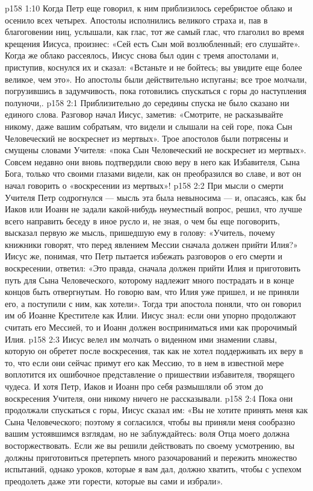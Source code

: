\vs p158 1:10 Когда Петр еще говорил, к ним приблизилось серебристое облако и осенило всех четырех. Апостолы исполнились великого страха и, пав в благоговении ниц, услышали, как глас, тот же самый глас, что глаголил во время крещения Иисуса, произнес: «Сей есть Сын мой возлюбленный; его слушайте». Когда же облако рассеялось, Иисус снова был один с тремя апостолами и, приступив, коснулся их и сказал: «Встаньте и не бойтесь; вы увидите еще более великое, чем это». Но апостолы были действительно испуганы; все трое молчали, погрузившись в задумчивость, пока готовились спускаться с горы до наступления полуночи,.
\vs p158 2:1 Приблизительно до середины спуска не было сказано ни единого слова. Разговор начал Иисус, заметив: «Смотрите, не расказывайте никому, даже вашим собратьям, что видели и слышали на сей горе, пока Сын Человеческий не воскреснет из мертвых». Трое апостолов были потрясены и смущены словами Учителя: «пока Сын Человеческий не воскреснет из мертвых». Совсем недавно они вновь подтвердили свою веру в него как Избавителя, Сына Бога, только что своими глазами видели, как он преобразился во славе, и вот он начал говорить о «воскресении из мертвых»!
\vs p158 2:2 При мысли о смерти Учителя Петр содрогнулся --- мысль эта была невыносима --- и, опасаясь, как бы Иаков или Иоанн не задали какой\hyp{}нибудь неуместный вопрос, решил, что лучше всего направить беседу в иное русло и, не зная, о чем бы еще поговорить, высказал первую же мысль, пришедшую ему в голову: «Учитель, почему книжники говорят, что перед явлением Мессии сначала должен прийти Илия?» Иисус же, понимая, что Петр пытается избежать разговоров о его смерти и воскресении, ответил: «Это правда, сначала должен прийти Илия и приготовить путь для Сына Человеческого, которому надлежит много пострадать и в конце концов быть отвергнутым. Но говорю вам, что Илия уже пришел, и не приняли его, а поступили с ним, как хотели». Тогда три апостола поняли, что он говорил им об Иоанне Крестителе как Илии. Иисус знал: если они упорно продолжают считать его Мессией, то и Иоанн должен восприниматься ими как пророчимый Илия.
\vs p158 2:3 Иисус велел им молчать о виденном ими знамении славы, которую он обретет после воскресения, так как не хотел поддерживать их веру в то, что если они сейчас примут его как Мессию, то в нем в известной мере воплотится их ошибочное представление о пришествии избавителя, творящего чудеса. И хотя Петр, Иаков и Иоанн про себя размышляли об этом до воскресения Учителя, они никому ничего не рассказывали.
\vs p158 2:4 Пока они продолжали спускаться с горы, Иисус сказал им: «Вы не хотите принять меня как Сына Человеческого; поэтому я согласился, чтобы вы приняли меня сообразно вашим устоявшимся взглядам, но не заблуждайтесь: воля Отца моего должна восторжествовать. Если же вы решили действовать по своему усмотрению, вы должны приготовиться претерпеть много разочарований и пережить множество испытаний, однако уроков, которые я вам дал, должно хватить, чтобы с успехом преодолеть даже эти горести, которые вы сами и избрали».

